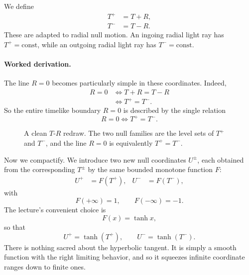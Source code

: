 We define
\begin{align}
T^+ &= T+R, \\
T^- &= T-R.
\end{align}
These are adapted to radial null motion. An ingoing radial light ray has \(T^+=\text{const}\), while an outgoing radial light ray has \(T^-=\text{const}\).

\paragraph{Worked derivation.}
The line \(R=0\) becomes particularly simple in these coordinates. Indeed,
\begin{align}
R=0
&\iff T+R=T-R \\
&\iff T^+=T^-.
\end{align}
So the entire timelike boundary \(R=0\) is described by the single relation
\begin{equation}
R=0 \iff T^+=T^-.
\end{equation}

\begin{figure}[htbp]
\centering
{}
\caption{A clean \(T\)-\(R\) redraw. The two null families are the level sets of \(T^+\) and \(T^-\), and the line \(R=0\) is equivalently \(T^+=T^-\).}
\end{figure}

Now we compactify. We introduce two new null coordinates \(U^\pm\), each obtained from the corresponding \(T^\pm\) by the same bounded monotone function \(F\):
\begin{align}
U^+ &= F(T^+), &
U^- &= F(T^-),
\end{align}
with
\begin{equation}
F(+\infty)=1,
\qquad
F(-\infty)=-1.
\end{equation}
The lecture's convenient choice is
\begin{equation}
F(x)=\tanh x,
\end{equation}
so that
\begin{equation}
U^+ = \tanh(T^+),
\qquad
U^- = \tanh(T^-).
\end{equation}
There is nothing sacred about the hyperbolic tangent. It is simply a smooth function with the right limiting behavior, and so it squeezes infinite coordinate ranges down to finite ones.

